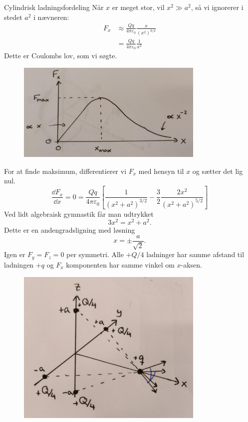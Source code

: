 \begin{opgave}{Cylindrisk ladningsfordeling}
    Når $x$ er meget stor, vil $x^2\gg a^2$, så vi ignorerer i stedet $a^2$ i nævneren:
    \begin{align*}
        F_x&\approx\frac{Qq}{4\pi\varepsilon_0}\frac{x}{(x^2)^{3/2}}\\
        &=\frac{Qq}{4\pi\varepsilon_0}\frac{1}{x^2}
    \end{align*}
    Dette er Coulombs lov, som vi søgte.
    \begin{figure}[H]
        \centering
        \includegraphics[width=0.8\textwidth]{facit/figurer/elektro/elektro_opg10,4.jpg}
    \end{figure}
    For at finde maksimum, differentierer vi $F_x$ med hensyn til $x$ og sætter det lig nul.
    \[ \frac{\dd F_x}{\dd x}=0=\frac{Qq}{4\pi\varepsilon_0}\left[\frac{1}{(x^2+a^2)^{3/2}}-\frac{3}{2}\frac{2x^2}{(x^2+a^2)^{5/2}}\right] \]
    Ved lidt algebraisk gymnastik får man udtrykket
    \[ 3x^2=x^2+a^2. \]
    Dette er en andengradsligning med løsning
    \[ x=\pm \frac{a}{\sqrt{2}}. \]
    \opg Igen er $F_y=F_z=0$ per symmetri. Alle $+Q/4$ ladninger har samme afstand til ladningen $+q$ og $F_x$ komponenten har samme vinkel om $x$-aksen.
    \begin{figure}[H]
        \centering
        \includegraphics[width=0.8\textwidth]{facit/figurer/elektro/elektro_opg10,5.jpg}

\end{figure}
\end{opgave}
